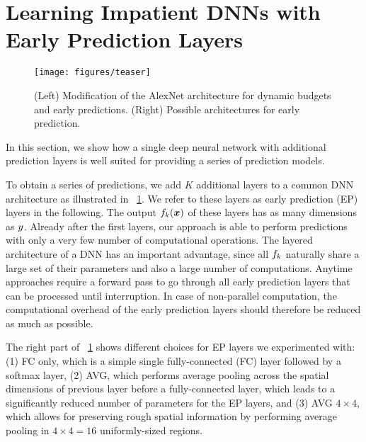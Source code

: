\documentclass{bmvc2k}
\begin{document}
\section{Learning Impatient DNNs with Early Prediction Layers}
\label{sec:impatientcnns}

    \begin{figure}[tb]
        \centering
        \texttt{[image: figures/teaser]}
        \caption{(Left) Modification of the AlexNet architecture for dynamic budgets and early predictions. (Right) Possible architectures
        for early prediction.}
        \label{fig:architecture}
    \end{figure}

    In this section, we show how a single deep neural network
    with additional prediction layers is well suited for providing a series
    of prediction models.

    To obtain a series of predictions, we add
    $K$ additional layers to a common DNN architecture as 
    illustrated in \figurename~\ref{fig:architecture}.
    We refer to these layers as early prediction (EP) layers in the following.
    The output $f_k(\bm{x})$ of these layers has as many dimensions as $y$.
    Already after the first layers, our approach is able to perform predictions
    with only a very few number of computational operations. 
    The layered architecture of a DNN has an important advantage, since 
    all $f_k$ naturally share a large set of their parameters and 
    also a large number of computations. 
    Anytime approaches
    require a forward pass to go through all 
    early prediction layers that can be processed until interruption. 
    In case of non-parallel computation, the computational 
    overhead of the early prediction layers should therefore be reduced
    as much as possible. 
    
    The right part of \figurename~\ref{fig:architecture}
    shows different choices for EP layers we experimented
    with: (1) FC only, which is a simple single fully-connected (FC) layer followed by a softmax layer,
    (2) AVG, which performs average pooling across the spatial dimensions of previous layer before 
    a fully-connected layer, which leads to a significantly reduced number of parameters for the EP layers,
    and (3) AVG $4 \times 4$, which allows for preserving rough spatial information
    by performing average pooling in $4 \times 4 = 16$ uniformly-sized regions.
    
\end{document}
